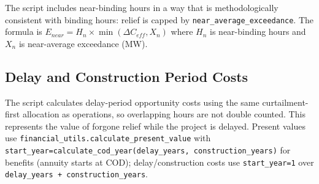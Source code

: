 \documentclass[ctcc_full_documentation.tex]{subfiles}
\begin{document}
The script includes near-binding hours in a way that is methodologically consistent with binding hours: relief is capped by \texttt{near\_average\_exceedance}. The formula is $E_{near} = H_n \times \min(\Delta C_{eff}, X_n)$ where $H_n$ is near-binding hours and $X_n$ is near-average exceedance (MW).

\subsection{Delay and Construction Period Costs}

The script calculates delay-period opportunity costs using the same curtailment-first allocation as operations, so overlapping hours are not double counted. This represents the value of forgone relief while the project is delayed. Present values use \texttt{financial\_utils.calculate\_present\_value} with \texttt{start\_year=calculate\_cod\_year(delay\_years, construction\_years)} for benefits (annuity starts at COD); delay/construction costs use \texttt{start\_year=1} over \texttt{delay\_years + construction\_years}.
\end{document}
